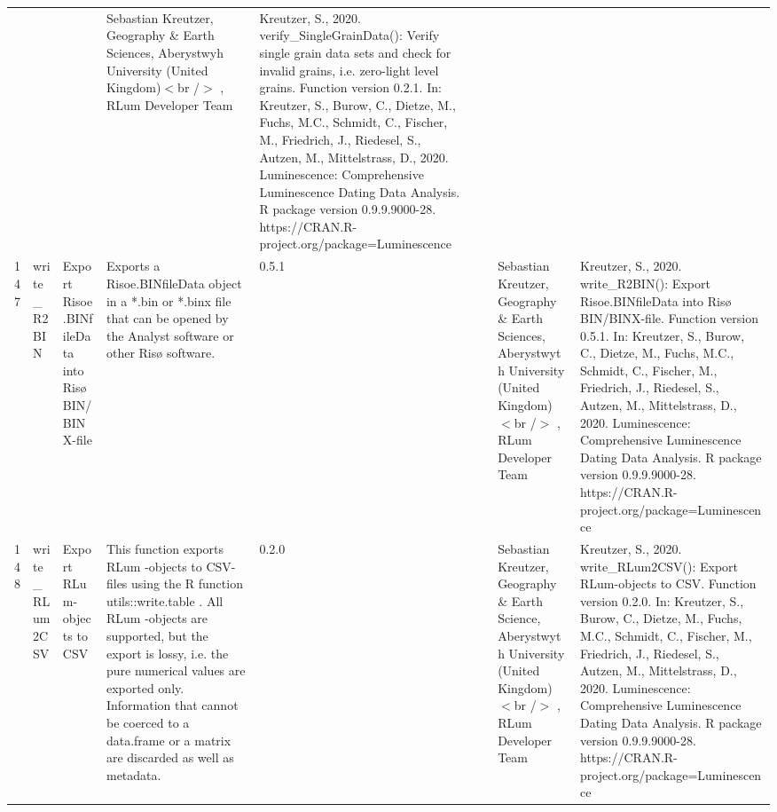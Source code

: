\begin{table}[ht]
\begin{tabular}{rllllllll}
 &  &  & Sebastian Kreutzer, Geography \& Earth Sciences, Aberystwyh University (United Kingdom)$<$br /$>$ , RLum Developer Team & Kreutzer, S., 2020. verify\_SingleGrainData(): Verify single grain data sets and check for invalid grains, i.e. zero-light level grains. Function version 0.2.1. In: Kreutzer, S., Burow, C., Dietze, M., Fuchs, M.C., Schmidt, C., Fischer, M., Friedrich, J., Riedesel, S., Autzen, M., Mittelstrass, D., 2020. Luminescence: Comprehensive Luminescence Dating Data Analysis. R package version 0.9.9.9000-28. https://CRAN.R-project.org/package=Luminescence
 \\ 
  147 & write\_R2BIN & Export Risoe.BINfileData into Risø BIN/BINX-file & Exports a Risoe.BINfileData object in a *.bin or *.binx file that can be opened by the Analyst software or other Risø software. & 0.5.1
 &  &  & Sebastian Kreutzer, Geography \& Earth Sciences, Aberystwyth University (United Kingdom)$<$br /$>$ , RLum Developer Team & Kreutzer, S., 2020. write\_R2BIN(): Export Risoe.BINfileData into Risø BIN/BINX-file. Function version 0.5.1. In: Kreutzer, S., Burow, C., Dietze, M., Fuchs, M.C., Schmidt, C., Fischer, M., Friedrich, J., Riedesel, S., Autzen, M., Mittelstrass, D., 2020. Luminescence: Comprehensive Luminescence Dating Data Analysis. R package version 0.9.9.9000-28. https://CRAN.R-project.org/package=Luminescence
 \\ 
  148 & write\_RLum2CSV & Export RLum-objects to CSV & This function exports  RLum -objects to CSV-files using the R function utils::write.table . All  RLum -objects are supported, but the export is lossy, i.e. the pure numerical values are exported only. Information that cannot be coerced to a  data.frame  or a  matrix  are discarded as well as metadata. & 0.2.0
 &  &  & Sebastian Kreutzer, Geography \& Earth Science, Aberystwyth University (United Kingdom)$<$br /$>$ , RLum Developer Team & Kreutzer, S., 2020. write\_RLum2CSV(): Export RLum-objects to CSV. Function version 0.2.0. In: Kreutzer, S., Burow, C., Dietze, M., Fuchs, M.C., Schmidt, C., Fischer, M., Friedrich, J., Riedesel, S., Autzen, M., Mittelstrass, D., 2020. Luminescence: Comprehensive Luminescence Dating Data Analysis. R package version 0.9.9.9000-28. https://CRAN.R-project.org/package=Luminescence
 \\ 
   \hline
\end{tabular}
\end{table}


